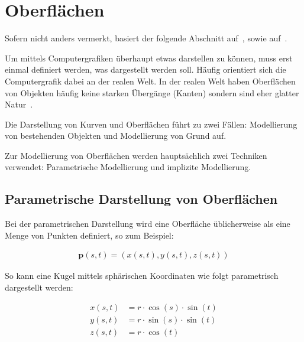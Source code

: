 
\section{Oberflächen}
\label{sec:surfaces}

Sofern nicht anders vermerkt, basiert der folgende Abschnitt
auf~\cite[S. 1ff]{menon_introduction_1996}, sowie
auf~\cite[S. 79 bis 115]{glassner_introduction_1989}.

Um mittels Computergrafiken überhaupt etwas darstellen zu können, muss
erst einmal definiert werden, was dargestellt werden soll. Häufig
orientiert sich die Computergrafik dabei an der realen Welt.  In der
realen Welt haben Oberflächen von Objekten häufig keine starken
Übergänge (Kanten) sondern sind eher glatter Natur~\parencite[S.
471]{foley_computer_1996}.

Die Darstellung von Kurven und Oberflächen führt zu zwei Fällen: Modellierung
von bestehenden Objekten und Modellierung von Grund auf.

Zur Modellierung von Oberflächen werden hauptsächlich zwei Techniken verwendet:
Parametrische Modellierung und implizite Modellierung.

\subsection{Parametrische Darstellung von Oberflächen}
\label{subsec:surfaces:display:parametric}

Bei der parametrischen Darstellung wird eine Oberfläche üblicherweise als
eine Menge von Punkten definiert, so zum
Beispiel:

\begin{gather}\label{eq:surface_parametric}
    \bm{p}(s, t) = (x(s, t), y(s, t), z(s, t))
\end{gather}

So kann eine Kugel mittels sphärischen Koordinaten wie
folgt parametrisch dargestellt werden:

\begin{align}\label{eq:sphere_parametric}
    x(s, t) &= r \cdot \cos(s) \cdot \sin(t) \\
    y(s, t) &= r \cdot \sin(s) \cdot \sin(t) \\
    z(s, t) &= r \cdot \cos(t)
\end{align}

